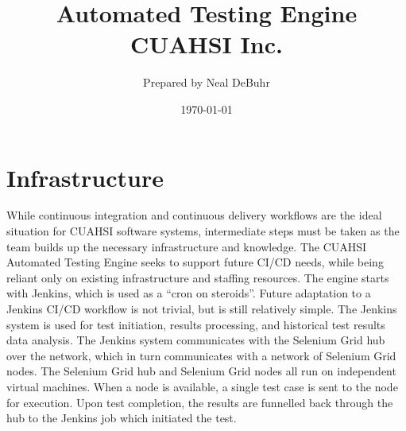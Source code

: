 \documentclass[10pt]{article}
\title{%
  Automated Testing Engine \\
  {\large \subtitleaccent~~CUAHSI Inc.~~\subtitleaccent}}
\author{Prepared by Neal DeBuhr}
\date{\today}
\begin{document}
\maketitle

\newpage
\section{Infrastructure}
While continuous integration and continuous delivery workflows are the ideal situation for CUAHSI software systems, intermediate steps must be taken as the team builds up the necessary infrastructure and knowledge.  The CUAHSI Automated Testing Engine seeks to support future CI/CD needs, while being reliant only on existing infrastructure and staffing resources.  The engine starts with Jenkins, which is used as a ``cron on steroids''.  Future adaptation to a Jenkins CI/CD workflow is not trivial, but is still relatively simple.  The Jenkins system is used for test initiation, results processing, and historical test results data analysis.  The Jenkins system communicates with the Selenium Grid hub over the network, which in turn communicates with a network of Selenium Grid nodes.  The Selenium Grid hub and Selenium Grid nodes all run on independent virtual machines.  When a node is available, a single test case is sent to the node for execution.  Upon test completion, the results are funnelled back through the hub to the Jenkins job which initiated the test.
\end{document}

